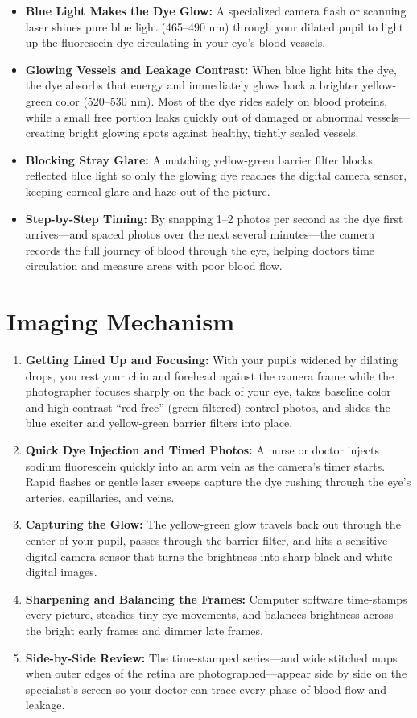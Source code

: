 \begin{itemize}
    \item \textbf{Blue Light Makes the Dye Glow:} A specialized camera flash or scanning laser shines pure blue light (465--490 nm) through your dilated pupil to light up the fluorescein dye circulating in your eye's blood vessels.
    \item \textbf{Glowing Vessels and Leakage Contrast:} When blue light hits the dye, the dye absorbs that energy and immediately glows back a brighter yellow-green color (520--530 nm). Most of the dye rides safely on blood proteins, while a small free portion leaks quickly out of damaged or abnormal vessels---creating bright glowing spots against healthy, tightly sealed vessels.
    \item \textbf{Blocking Stray Glare:} A matching yellow-green barrier filter blocks reflected blue light so only the glowing dye reaches the digital camera sensor, keeping corneal glare and haze out of the picture.
    \item \textbf{Step-by-Step Timing:} By snapping 1--2 photos per second as the dye first arrives---and spaced photos over the next several minutes---the camera records the full journey of blood through the eye, helping doctors time circulation and measure areas with poor blood flow.
\end{itemize}

\section{Imaging Mechanism}

\begin{enumerate}
    \item \textbf{Getting Lined Up and Focusing:} With your pupils widened by dilating drops, you rest your chin and forehead against the camera frame while the photographer focuses sharply on the back of your eye, takes baseline color and high-contrast ``red-free'' (green-filtered) control photos, and slides the blue exciter and yellow-green barrier filters into place.
    \item \textbf{Quick Dye Injection and Timed Photos:} A nurse or doctor injects sodium fluorescein quickly into an arm vein as the camera's timer starts. Rapid flashes or gentle laser sweeps capture the dye rushing through the eye's arteries, capillaries, and veins.
    \item \textbf{Capturing the Glow:} The yellow-green glow travels back out through the center of your pupil, passes through the barrier filter, and hits a sensitive digital camera sensor that turns the brightness into sharp black-and-white digital images.
    \item \textbf{Sharpening and Balancing the Frames:} Computer software time-stamps every picture, steadies tiny eye movements, and balances brightness across the bright early frames and dimmer late frames.
    \item \textbf{Side-by-Side Review:} The time-stamped series---and wide stitched maps when outer edges of the retina are photographed---appear side by side on the specialist's screen so your doctor can trace every phase of blood flow and leakage.
\end{enumerate}


